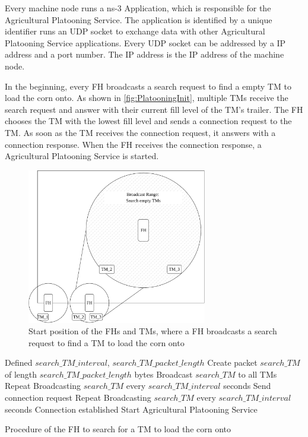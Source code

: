 Every machine node runs a ns-3 Application, which is responsible for the Agricultural Platooning Service. The application
is identified by a unique identifier runs an UDP socket to exchange data with other Agricultural Platooning Service applications.
Every UDP socket can be addressed by a IP address and a port number. The IP address is the IP address of the machine node.

In the beginning, every \ac{FH} broadcasts a search request to find a empty \ac{TM} to load the corn onto.
As shown in \autoref{fig:PlatooningInit}, multiple \ac{TM}s receive the search request and answer with
their current fill level of the \ac{TM}'s trailer.
The \ac{FH} chooses the \ac{TM} with the lowest fill level and sends a connection request to the \ac{TM}. As soon as the
\ac{TM} receives the connection request, it answers with a connection response. When the \ac{FH} receives the connection response, a
Agricultural Platooning Service is started.
\begin{figure}[H]%
	\centering
	\includegraphics[width=0.7\textwidth]{figures/platoonINIT}
	\caption{Start position of the \acf{FH}s and \acf{TM}s, where a \ac{FH} broadcasts a search request to find
	a \ac{TM} to load the corn onto}
	\label{fig:PlatooningInit}%
\end{figure}

\begin{algorithm}
\begin{algorithmic}[1]
\REQUIRE Defined $search\_TM\_interval$, $search\_TM\_packet\_length$
\STATE Create packet $search\_TM$ of length $search\_TM\_packet\_length$ bytes
\STATE Broadcast $search\_TM$ to all \acs{TM}s
    \STATE Repeat Broadcasting $search\_TM$ every $search\_TM\_interval$ seconds
\ELSE
	\STATE Send connection request
		\STATE Repeat Broadcasting $search\_TM$ every $search\_TM\_interval$ seconds
	\ELSE
		\STATE Connection established
		\STATE Start Agricultural Platooning Service
	\ENDIF
\ENDIF
\end{algorithmic}
\caption{Procedure of the \acf{FH} to search for a \acf{TM} to load the corn onto}
\label{alg:SearchTM}
\end{algorithm}

